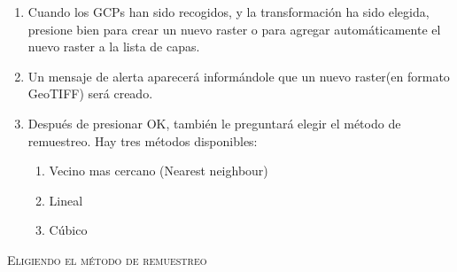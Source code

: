 \begin{enumerate}
\item Cuando los GCPs han sido recogidos, y la transformación ha sido elegida, presione bien  para crear un nuevo raster o  para agregar automáticamente el nuevo raster a la lista de capas.
\item Un mensaje de alerta aparecerá informándole que un nuevo raster(en formato GeoTIFF) será creado.
\item Después de presionar OK, también le preguntará elegir el método de remuestreo. Hay tres métodos disponibles:

\begin{enumerate}
\item Vecino mas cercano (Nearest neighbour)
\item Lineal
\item Cúbico
\end{enumerate}
\end{enumerate}

\begin{Tip}\caption{\textsc{Eligiendo el método de remuestreo}}
\end{Tip}


